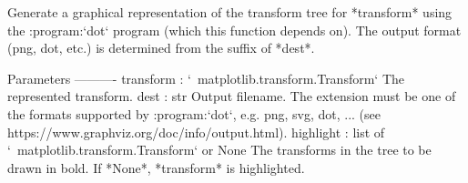 \begin{DoxyVerb}Generate a graphical representation of the transform tree for *transform*
using the :program:`dot` program (which this function depends on).  The
output format (png, dot, etc.) is determined from the suffix of *dest*.

Parameters
----------
transform : `~matplotlib.transform.Transform`
    The represented transform.
dest : str
    Output filename.  The extension must be one of the formats supported
    by :program:`dot`, e.g. png, svg, dot, ...
    (see https://www.graphviz.org/doc/info/output.html).
highlight : list of `~matplotlib.transform.Transform` or None
    The transforms in the tree to be drawn in bold.
    If *None*, *transform* is highlighted.
\end{DoxyVerb}
 